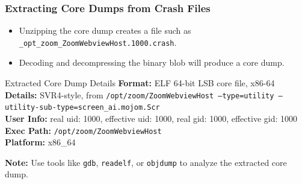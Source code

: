 \begin{frame}
\frametitle{Extracting Core Dumps from Crash Files}

\begin{itemize}
    \item Unzipping the core dump creates a file such as \texttt{\_opt\_zoom\_ZoomWebviewHost.1000.crash}.
    \item Decoding and decompressing the binary blob will produce a core dump.
\end{itemize}


\begin{block}{Extracted Core Dump Details}
\textbf{Format:} ELF 64-bit LSB core file, x86-64 \\
\textbf{Details:} SVR4-style, from \texttt{/opt/zoom/ZoomWebviewHost --type=utility --utility-sub-type=screen\_ai.mojom.Scr} \\
\textbf{User Info:} real uid: 1000, effective uid: 1000, real gid: 1000, effective gid: 1000 \\
\textbf{Exec Path:} \texttt{/opt/zoom/ZoomWebviewHost} \\
\textbf{Platform:} x86\_64
\end{block}

\textbf{Note:} Use tools like \texttt{gdb}, \texttt{readelf}, or \texttt{objdump} to analyze the extracted core dump.

\end{frame}


